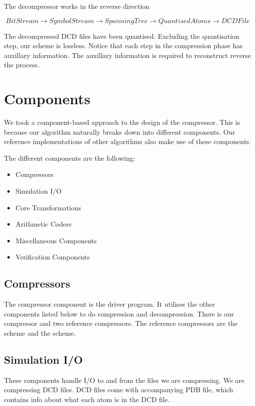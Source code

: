 \documentclass{report}
\begin{document}
The decompressor works in the reverse direction

\[ BitStream \to SymbolStream \to SpanningTree \to QuantisedAtoms \to
DCDFile \]

The decompressed DCD files have been quantised. Excluding the quantisation
step, our scheme is lossless. Notice that each step in the compression phase
has auxillary information. The auxillary information is required to
reconstruct reverse the process.


\section{Components}

We took a component-based approach to the design of the compressor. This is
because our algorithm naturally breaks down into different components. Our
reference implementations of other algorithms also make use of these
components.

The different components are the following:
\begin{itemize}
\item Compressors
\item Simulation I/O
\item Core Transformations
\item Arithmetic Coders
\item Miscellaneous Components
\item Verification Components
\end{itemize}

\subsection{Compressors}

The compressor component is the driver program. It utilises the other
components listed below to do compression and decompression. There is our
compressor and two reference compressors. The reference compressors are the
\citet{omeltchenko2000sls} scheme and the \citet{devillers2000gci} scheme.


\subsection{Simulation I/O}

These components handle I/O to and from the files we are compressing. We are
compressing DCD files. DCD files come with accompanying PDB file, which
contains info about what each atom is in the DCD file.
\end{document}
